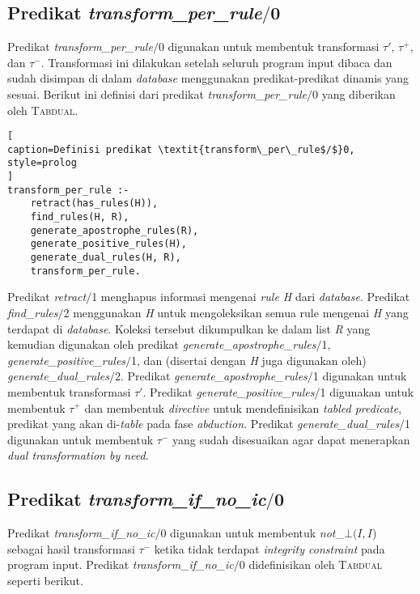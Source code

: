 \subsection{Predikat \textit{transform\_per\_rule$/$}0}

Predikat \textit{transform\_per\_rule$/$}0 digunakan untuk membentuk transformasi $\tau'$, $\tau^+$, dan $\tau^-$. Transformasi ini dilakukan setelah seluruh program input dibaca dan sudah disimpan di dalam \textit{database} menggunakan predikat-predikat dinamis yang sesuai. Berikut ini definisi dari predikat \textit{transform\_per\_rule$/$}0 yang diberikan oleh \textsc{Tabdual}.
\\

\begin{lstlisting}[
caption=Definisi predikat \textit{transform\_per\_rule$/$}0,
style=prolog
]
transform_per_rule :-
	retract(has_rules(H)),
	find_rules(H, R),
	generate_apostrophe_rules(R),
	generate_positive_rules(H),
	generate_dual_rules(H, R),
	transform_per_rule.
\end{lstlisting}

Predikat \textit{retract$/$}1 menghapus informasi mengenai \textit{rule H} dari \textit{database}. Predikat \textit{find\_rules$/$}2 menggunakan \textit{H} untuk mengoleksikan semua rule mengenai \textit{H} yang terdapat di \textit{database}. Koleksi tersebut dikumpulkan ke dalam list \textit{R} yang kemudian digunakan oleh predikat \textit{generate\_apostrophe\_rules$/$}1, \textit{generate\_positive\_rules$/$}1, dan (disertai dengan \textit{H} juga digunakan oleh) \textit{generate\_dual\_rules$/$}2. Predikat \textit{generate\_apostrophe\_rules$/$}1 digunakan untuk membentuk transformasi $\tau'$. Predikat \textit{generate\_positive\_rules$/$}1 digunakan untuk membentuk $\tau^+$ dan membentuk \textit{directive} untuk mendefinisikan \textit{tabled predicate}, predikat yang akan di-\textit{table} pada fase \textit{abduction}. Predikat \textit{generate\_dual\_rules$/$}1 digunakan untuk membentuk $\tau^-$ yang sudah disesuaikan agar dapat menerapkan \textit{dual transformation by need}.

\subsection{Predikat \textit{transform\_if\_no\_ic$/$}0}

Predikat \textit{transform\_if\_no\_ic$/$}0 digunakan untuk membentuk \textit{not}\_$\bot(\textit{I},\textit{I}$) sebagai hasil transformasi $\tau^-$ ketika tidak terdapat \textit{integrity constraint} pada program input. Predikat \textit{transform\_if\_no\_ic$/$}0 didefinisikan oleh \textsc{Tabdual} seperti berikut.
\\

